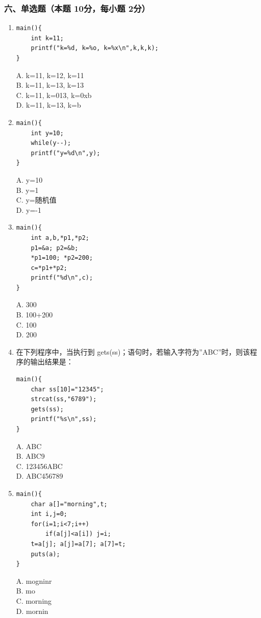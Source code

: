 \documentclass[12pt,a4paper]{article}
\begin{document}
\subsubsection*{六、单选题（本题 10分，每小题 2分）}
\begin{enumerate}
    \item 
    \begin{verbatim}
main(){
    int k=11;
    printf("k=%d, k=%o, k=%x\n",k,k,k);
}
    \end{verbatim}
    A. k=11, k=12, k=11 \\
    B. k=11, k=13, k=13 \\
    C. k=11, k=013, k=0xb \\
    D. k=11, k=13, k=b
    
    \item 
    \begin{verbatim}
main(){
    int y=10;
    while(y--);
    printf("y=%d\n",y);
}
    \end{verbatim}
    A. y=10 \\
    B. y=1 \\
    C. y=随机值 \\
    D. y=-1
    
    \item 
    \begin{verbatim}
main(){
    int a,b,*p1,*p2;
    p1=&a; p2=&b;
    *p1=100; *p2=200;
    c=*p1+*p2;
    printf("%d\n",c);
}
    \end{verbatim}
    A. 300 \\
    B. 100+200 \\
    C. 100 \\
    D. 200
    
    \item 在下列程序中，当执行到 gets(ss)；语句时，若输入字符为”ABC”时，则该程序的输出结果是：
    \begin{verbatim}
main(){
    char ss[10]="12345";
    strcat(ss,"6789");
    gets(ss);
    printf("%s\n",ss);
}
    \end{verbatim}
    A. ABC \\
    B. ABC9 \\
    C. 123456ABC \\
    D. ABC456789
    
    \item 
    \begin{verbatim}
main(){
    char a[]="morning",t;
    int i,j=0;
    for(i=1;i<7;i++)
        if(a[j]<a[i]) j=i;
    t=a[j]; a[j]=a[7]; a[7]=t;
    puts(a);
}
    \end{verbatim}
    A. mogninr \\
    B. mo \\
    C. morning \\
    D. mornin
\end{enumerate}
\end{document}
